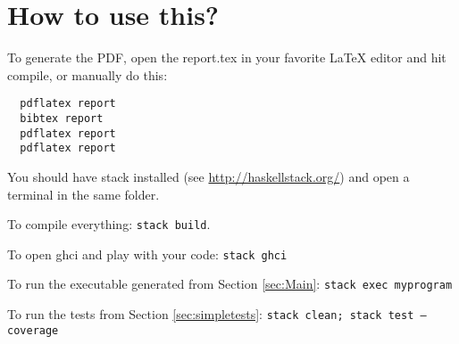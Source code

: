
\section{How to use this?}

To generate the PDF, open the report.tex in your favorite LaTeX editor and
hit compile, or manually do this:

\begin{verbatim}
  pdflatex report
  bibtex report
  pdflatex report
  pdflatex report
\end{verbatim}

You should have stack installed (see \url{http://haskellstack.org/}) and
open a terminal in the same folder.

To compile everything: \texttt{stack build}.

To open ghci and play with your code: \texttt{stack ghci}

To run the executable generated from Section \ref{sec:Main}: \texttt{stack exec myprogram}

To run the tests from Section \ref{sec:simpletests}: \texttt{stack clean; stack test --coverage}
